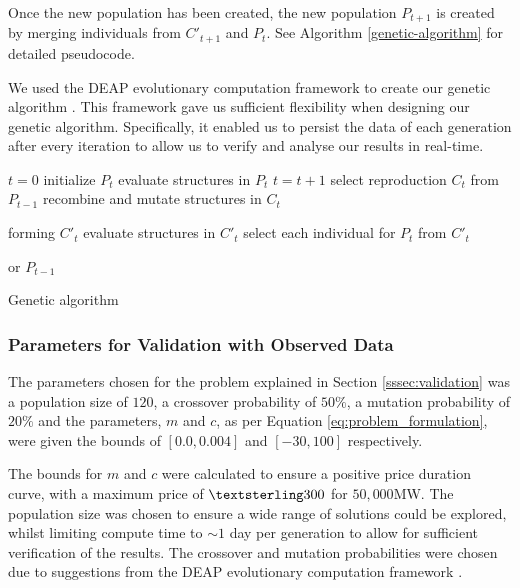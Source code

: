 Once the new population has been created, the new population $P_{t+1}$ is created by merging individuals from $C'_{t+1}$ and $P_{t}$. See Algorithm \ref{genetic-algorithm} for detailed pseudocode.

We used the DEAP evolutionary computation framework to create our genetic algorithm \cite{Gagn2012}. This framework gave us sufficient flexibility when designing our genetic algorithm. Specifically, it enabled us to persist the data of each generation after every iteration to allow us to verify and analyse our results in real-time.

%
\begin{algorithm}[t]
	\begin{algorithmic}[1]
		\State $t=0$
		\State initialize $P_{t}$
		\State evaluate structures in $P_{t}$
		\State $t=t+1$
		\State select reproduction $C_{t}$ from $P_{t-1}$
		\State recombine and mutate structures in $C_{t}$
		
		forming $C'_{t}$
		\State evaluate structures in $C'_{t}$
		\State select each individual for $P_{t}$ from $C'_{t}$ 
		
		or $P_{t-1}$
		\EndWhile
		\caption{Genetic algorithm \cite{FogelDavidB2009}}
		\label{genetic-algorithm}
	\end{algorithmic}
\end{algorithm}

\subsubsection{Parameters for Validation with Observed Data}
\label{ssec:ga_params_valid}

The parameters chosen for the problem explained in Section \ref{sssec:validation} was a population size of $120$, a crossover probability of $50\%$, a mutation probability of $20\%$ and the parameters, $m$ and $c$, as per Equation \ref{eq:problem_formulation}, were given the bounds of $[0.0, 0.004]$ and $[-30, 100]$ respectively. 

The bounds for $m$ and $c$ were calculated to ensure a positive price duration curve, with a maximum price of $\textsterling300$ for $50,000$MW. The population size was chosen to ensure a wide range of solutions could be explored, whilst limiting compute time to ${\sim}1$ day per generation to allow for sufficient verification of the results. The crossover and mutation probabilities were chosen due to suggestions from the DEAP evolutionary computation framework \cite{Gagn2012}.


